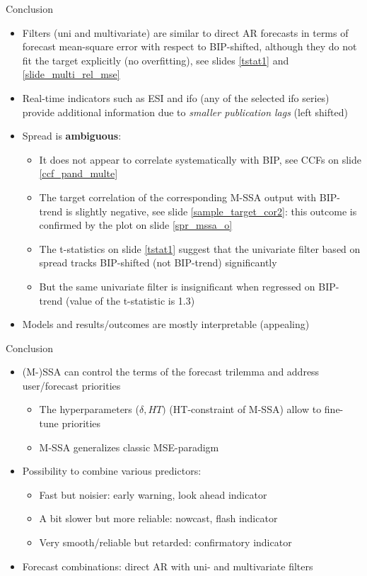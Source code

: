 \documentclass{beamer}
\begin{document}
\begin{frame} {Conclusion}
\begin{itemize}
\item Filters (uni and multivariate) are similar to direct AR forecasts in terms of forecast mean-square error with respect to BIP-shifted, although they do not fit the target explicitly (no overfitting), see slides \eqref{tstat1} and \eqref{slide_multi_rel_mse}
\item Real-time indicators such as {ESI} and {ifo} (any of the selected ifo series) provide additional information due to \emph{smaller publication lags} (left shifted) 
\item {Spread} is \textbf{ambiguous}:
\begin{itemize}
\item It does not appear to correlate systematically  with BIP, see CCFs on slide \eqref{ccf_pand_multe}
\item The target correlation of the corresponding M-SSA output with BIP-trend is slightly negative, see slide \eqref{sample_target_cor2}: this outcome is confirmed by the plot on slide \eqref{spr_mssa_o}
\item The t-statistics on slide \eqref{tstat1} suggest that the univariate filter based on spread tracks BIP-shifted (not BIP-trend) significantly
\item But the same univariate filter is insignificant when regressed on BIP-trend (value of the t-statistic is 1.3)
\end{itemize}
\item Models and results/outcomes are mostly interpretable (appealing)
\end{itemize}

\end{frame}


\begin{frame} {Conclusion}
\begin{itemize}
\item (M-)SSA can {control} the terms of the forecast trilemma and address user/forecast {priorities} 
\begin{itemize}
\item The {hyperparameters} ($\delta,HT)$ (HT-constraint of M-SSA) allow to {fine-tune} priorities
\item M-SSA {generalizes} classic MSE-paradigm
\end{itemize}
\item Possibility to {combine} various predictors: 
\begin{itemize}
\item {Fast} but noisier: early warning, {look ahead} indicator 
\item A bit slower but more {reliable}: nowcast, {flash} indicator 
\item Very {smooth}/reliable but retarded: {confirmatory} indicator
\end{itemize}
\item Forecast combinations: direct AR with uni- and multivariate filters
\end{itemize}

\end{frame}
\end{document}
